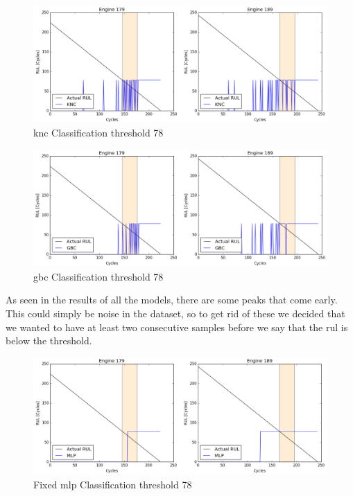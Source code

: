 \documentclass[english, a4paper]{report}
\begin{document}
{{{            \begin{figure}[H]
                \centering
                \includegraphics[width=\textwidth]{KNCClassi_78}
                \caption{\gls{knc} Classification threshold 78}
                \label{fig:KNCClassi78}
            \end{figure}
            
            \begin{figure}[H]
                \centering
                \includegraphics[width=\textwidth]{GBCClassi_78}
                \caption{\gls{gbc} Classification threshold 78}
                \label{fig:GBCClassi78}
            \end{figure}
            
            As seen in the results of all the models, there are some peaks that come early. This could simply be noise in the dataset, so to get rid of these we decided that we wanted to have at least two consecutive samples before we say that the \gls{rul} is below the threshold. 
            
            \begin{figure}[H]
                \centering
                \includegraphics[width=\textwidth]{Fixed_MLPClassi_78}
                \caption{Fixed \gls{mlp} Classification threshold 78}
                \label{fig:FixedMLPClassi78}
            \end{figure}
            
}}}
\end{document}
